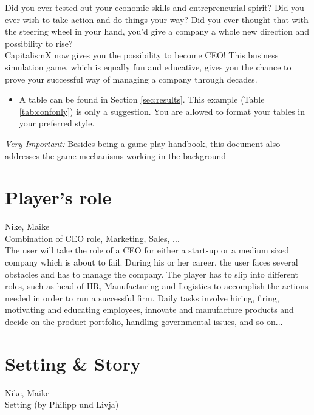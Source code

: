\documentclass[11pt,titlepage,oneside,openany]{book}
\begin{document}
Did you ever tested out your economic skills and entrepreneurial spirit? Did you ever wish to take action and do things your way? Did you ever thought that with the steering wheel in your hand, you'd give a company a whole new direction and possibility to rise? \\
CapitalismX now gives you the possibility to become CEO! This business simulation game, which is equally fun and educative, gives you the chance to prove your successful way of managing a company through decades.

\begin{itemize}
	\item A table can be found in Section \ref{sec:results}. This example (Table \ref{tab:confonly}) is only a suggestion. You are allowed to format your tables in your preferred style.
\end{itemize}

\emph{Very Important:} Besides being a game-play handbook, this document also addresses the game mechanisms working in the background
 
\section{Player's role}
Nike, Maike \\
Combination of CEO role, Marketing, Sales, ... \\

The user will take the role of a CEO for either a start-up or a medium sized company which is about to fail. During his or her career, the user faces several obstacles and has to manage the company. The player has to slip into different roles, such as head of HR, Manufacturing and Logistics to accomplish the actions needed in order to run a successful firm. Daily tasks involve hiring, firing, motivating and educating employees, innovate and manufacture products and decide on the product portfolio, handling governmental issues, and so on...

\section{Setting \& Story}
Nike, Maike \\
\cite{mochol08matcher}
Setting (by Philipp und Livja) \\
\end{document}
